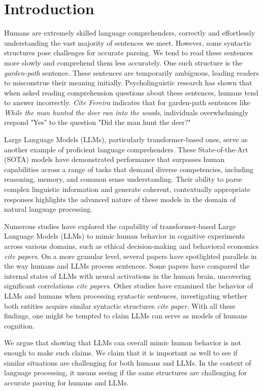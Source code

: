 \section{Introduction}

Humans are extremely skilled language comprehenders, correctly and effortlessly understanding the vast majority of sentences we meet. However, some syntactic structures pose challenges for accurate parsing. We tend to read these sentences more slowly and comprehend them less accurately. One such structure is the \emph{garden-path} sentence. These sentences are temporarily ambiguous, leading readers to misconstrue their meaning initially. Psycholinguistic research has shown that when asked reading comprehension questions about these sentences, humans tend to answer incorrectly. \emph{Cite Fereira} indicates that for garden-path sentences like \emph{While the man hunted the deer ran into the woods}, individuals overwhelmingly respond "Yes" to the question "Did the man hunt the deer?"

Large Language Models (LLMs), particularly transformer-based ones, serve as another example of proficient language comprehenders. These State-of-the-Art (SOTA) models have demonstrated performance that surpasses human capabilities across a range of tasks that demand diverse competencies, including reasoning, memory, and common sense understanding. Their ability to parse complex linguistic information and generate coherent, contextually appropriate responses highlights the advanced nature of these models in the domain of natural language processing.

Numerous studies have explored the capability of transformer-based Large Language Models (LLMs) to mimic human behavior in cognitive experiments across various domains, such as ethical decision-making and behavioral economics \emph{cite papers}. On a more granular level, several papers have spotlighted parallels in the way humans and LLMs process sentences. Some papers have compared the internal states of LLMs with neural activations in the human brain, uncovering significant correlations \emph{cite papers}. Other studies have examined the behavior of LLMs and humans when processing syntactic sentences, investigating whether both entities acquire similar syntactic structures \emph{cite paper}. With all these findings, one might be tempted to claim LLMs can serve as models of humans cognition.

We argue that showing that LLMs can overall mimic human behavior is not enough to make such claims. We claim that it is important as well to see if similar situations are challenging for both humans and LLMs. In the context of language processing, it means seeing if the same structures are challenging for accurate parsing for humans and LLMs.

